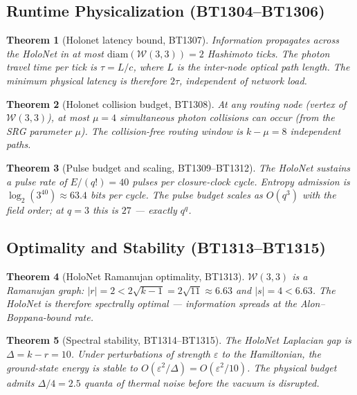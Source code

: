 \documentclass[12pt,a4paper]{article}
\newtheorem{theorem}{Theorem}[section]
\newcommand{\W}{\mathcal{W}(3,3)}
\newcommand{\eps}{\varepsilon}
\begin{document}
\subsection{Runtime Physicalization (BT1304--BT1306)}

\begin{theorem}[Holonet latency bound, BT1307]
  Information propagates across the HoloNet in at most $\mathrm{diam}(\W)=2$
  Hashimoto ticks. The photon travel time per tick is $\tau = L/c$, where
  $L$ is the inter-node optical path length. The minimum physical
  latency is therefore $2\tau$, independent of network load.
\end{theorem}

\begin{theorem}[Holonet collision budget, BT1308]
  At any routing node (vertex of $\W$), at most $\mu=4$ simultaneous
  photon collisions can occur (from the SRG parameter $\mu$). The
  collision-free routing window is $k-\mu=8$ independent paths.
\end{theorem}

\begin{theorem}[Pulse budget and scaling, BT1309--BT1312]
  The HoloNet sustains a pulse rate of $E/(q!)=40$ pulses per
  closure-clock cycle. Entropy admission is $\log_2(3^{40}) \approx 63.4$
  bits per cycle. The pulse budget scales as $O(q^3)$ with the field order;
  at $q=3$ this is $27$ — exactly $q^q$.
\end{theorem}

\subsection{Optimality and Stability (BT1313--BT1315)}

\begin{theorem}[HoloNet Ramanujan optimality, BT1313]
  $\W$ is a Ramanujan graph: $|r|=2 < 2\sqrt{k-1}=2\sqrt{11}\approx 6.63$
  and $|s|=4 < 6.63$. The HoloNet is therefore spectrally optimal —
  information spreads at the Alon--Boppana-bound rate.
\end{theorem}

\begin{theorem}[Spectral stability, BT1314--BT1315]
  The HoloNet Laplacian gap is $\Delta = k-r = 10$. Under perturbations
  of strength $\eps$ to the Hamiltonian, the ground-state energy is
  stable to $O(\eps^2/\Delta) = O(\eps^2/10)$.
  The physical budget admits $\Delta/4 = 2.5$ quanta of thermal noise
  before the vacuum is disrupted.
\end{theorem}
\end{document}
